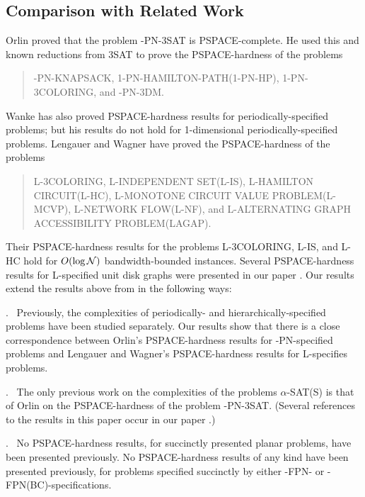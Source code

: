 \vspace*{-0.15in}
\subsection{Comparison with Related Work}\label{sec:comp}
Orlin \cite{Or82a} proved that the problem {-PN-3SAT} is 
{\sf PSPACE-}complete. He used this and known reductions from {\sf 3SAT} 
to prove the {\sf PSPACE-}hardness of the problems 
\begin{quote}
{-PN-KNAPSACK, 1-PN-HAMILTON-PATH(1-PN-HP), 1-PN-3COLORING,} and 
{-PN-3DM}.
\end{quote}
Wanke \cite{Wa93} has also proved {\sf PSPACE-}hardness results for periodically-specified problems; but his results do not hold for 1-dimensional 
periodically-specified problems. Lengauer and Wagner \cite{LW92} have proved
the {\sf PSPACE}-hardness of the problems 
\begin{quote}
{\sf L-3COLORING, L-INDEPENDENT SET(L-IS), L-HAMILTON CIRCUIT(L-HC), L-MONOTONE CIRCUIT  VALUE PROBLEM(L-MCVP), L-NETWORK FLOW(L-NF),} and {\sf L-ALTERNATING GRAPH ACCESSIBILITY PROBLEM(LAGAP).}
\end{quote}
Their {\sf PSPACE-}hardness results for the problems {\sf L-3COLORING, L-IS,}
and {\sf L-HC} hold for $O(\log {\cal N})$ bandwidth-bounded instances. Several
{\sf PSPACE-}hardness results for {\sf L-}specified unit disk graphs were 
presented in our paper \cite{MR+93}. 
Our results extend the results above from \cite{Or82a,LW92}  
in the following ways:

{}.~ Previously, the complexities of periodically- and hierarchically-specified
problems have been studied separately. Our results show that there is a
 close correspondence between Orlin's {\sf PSPACE-}hardness results for {-PN-}specified problems and Lengauer and Wagner's {\sf PSPACE-}hardness 
results for {\sf L-}specifies problems.

\smallskip
{}.~
The only previous work on the complexities of the problems 
$\alpha$-{\sf SAT(S)} is that of Orlin \cite{Or82a} on the 
{\sf PSPACE-}hardness of the problem {-PN-3SAT}. (Several references
to the results in this paper occur in our paper \cite{MR+93}.)

\smallskip
{}.~
No {\sf PSPACE-}hardness results, for succinctly presented 
planar problems, have been presented previously. No {\sf PSPACE-}hardness 
results of any kind have been presented previously, for problems specified
succinctly by either {-FPN-} or {-FPN(BC)-}specifications.

